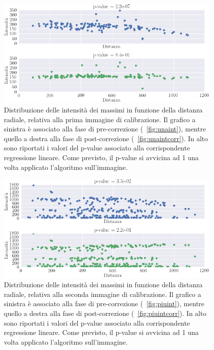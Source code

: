 \begin{figure}
 \centering
 \includegraphics[scale=.55]{img/CAP4pvalue1.png}
 \caption{\small{Distribuzione delle intensità dei massimi in funzione della distanza radiale, relativa alla prima immagine di calibrazione. Il grafico a sinistra è associato alla fase di pre-correzione (\figurename~\ref{fig:unaint}), mentre quello a destra alla fase di post-correzione (\figurename~\ref{fig:unaintcorr}). In alto sono riportati i valori del p-value associato alla corrispondente regressione lineare. Come previsto, il p-value si avvicina ad 1 una volta applicato l'algoritmo sull'immagine.}}
 \label{fig:pvalue1}
\end{figure}

\begin{figure}
 \centering
 \includegraphics[scale=.55]{img/CAP4pvalue2.png}
 \caption{\small{Distribuzione delle intensità dei massimi in funzione della distanza radiale, relativa alla seconda immagine di calibrazione. Il grafico a sinistra è associato alla fase di pre-correzione (\figurename~\ref{fig:piuint}), mentre quello a destra alla fase di post-correzione (\figurename~\ref{fig:piuintcorr}). In alto sono riportati i valori del p-value associato alla corrispondente regressione lineare. Come previsto, il p-value si avvicina ad 1 una volta applicato l'algoritmo sull'immagine.}}
 \label{fig:pvalue2}
\end{figure}

